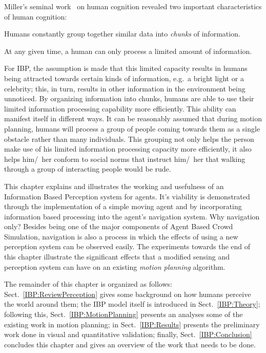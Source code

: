 Miller's seminal work~\cite{Miller:1956tr} on human cognition revealed two important characteristics of human cognition: 
\begin{inparaenum} 
\item Humans constantly group together similar data into \emph{chunks} of information. 
\item At any given time, a human can only process a limited amount of information. 
\end{inparaenum}
For IBP, the assumption is made that this limited capacity results in humans being attracted towards certain kinds of information, e.g.\ a bright light or a celebrity; this, in turn, results in other information in the environment being unnoticed. By organizing information into chunks, humans are able to use their limited information processing capability more efficiently. This ability can manifest itself in different ways. It can be reasonably assumed that during motion planning, humans will process a group of people coming towards them as a single obstacle rather than many individuals. This grouping not only helps the person make use of his limited information processing capacity more efficiently, it also helps him/~her conform to social norms that instruct him/~her that walking through a group of interacting people would be rude.


This chapter explains and illustrates the working and usefulness of an Information Based Perception system for agents. It's viability is demonstrated through the implementation of a simple moving agent and by incorporating information based processing into the agent's navigation system. Why navigation only? Besides being one of the major components of Agent Based Crowd Simulation, navigation is also a process in which the effects of using a new perception system can be observed easily. The experiments towards the end of this chapter illustrate the significant effects that a modified sensing and perception system can have on an existing \emph{motion planning} algorithm. 

The remainder of this chapter is organized as follows: Sect.~\ref{IBP:ReviewPerception} gives some background on how humans perceive the world around them; the IBP model itself is introduced in Sect.~\ref{IBP:Theory}; following this, Sect.~\ref{IBP:MotionPlanning} presents an analyses some of the existing work in motion planning; in Sect.~\ref{IBP:Results} presents the preliminary work done in visual and quantitative validation; finally, Sect.~\ref{IBP:Conclusion} concludes this chapter and gives an overview of the work that needs to be done. 

